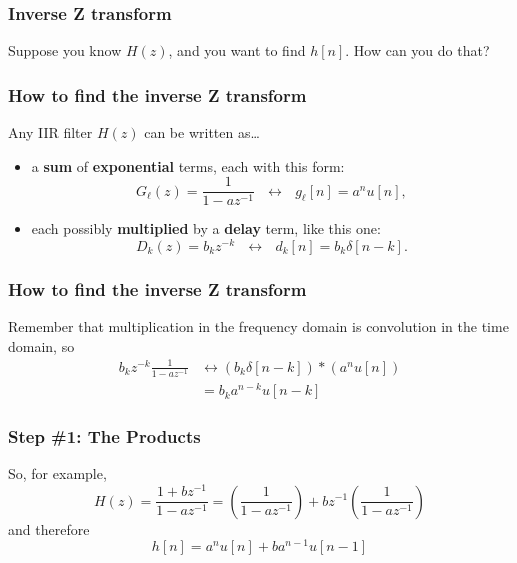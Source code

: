 \documentclass{beamer}
\begin{document}
\begin{frame}
  \frametitle{Inverse Z transform}

  Suppose you know $H(z)$, and you want to find $h[n]$.  How can you
  do that?
\end{frame}
      
\begin{frame}
  \frametitle{How to find the inverse Z transform}

  Any IIR filter $H(z)$ can be written as\ldots
  \begin{itemize}
  \item a {\bf sum} of {\bf exponential} terms, each with this form:
    \begin{displaymath}
      G_\ell(z)=\frac{1}{1-az^{-1}}~~~\leftrightarrow~~~g_\ell[n]= a^nu[n],
    \end{displaymath}
  \item each possibly {\bf multiplied} by a {\bf delay} term, like this one:
    \begin{displaymath}
      D_k(z)=b_kz^{-k}~~~\leftrightarrow~~~d_k[n]=b_k\delta[n-k].
    \end{displaymath}
  \end{itemize}
\end{frame}

\begin{frame}
  \frametitle{How to find the inverse Z transform}

  Remember that multiplication in the frequency domain is convolution
  in the time domain, so
  \begin{align*}
    b_kz^{-k}\frac{1}{1-az^{-1}}
    &\leftrightarrow\left(b_k\delta[n-k]\right)\ast\left( a^nu[n]\right)\\
    &= b_ka^{n-k}u[n-k]
  \end{align*}
\end{frame}

\begin{frame}
  \frametitle{Step \#1: The Products}

  So, for example,
  \begin{displaymath}
    H(z)=\frac{1+bz^{-1}}{1-az^{-1}}
    =\left(\frac{1}{1-az^{-1}}\right)+bz^{-1}\left(\frac{1}{1-az^{-1}}\right)
  \end{displaymath}
  and therefore
  \begin{displaymath}
    h[n] = a^nu[n] + ba^{n-1}u[n-1]
  \end{displaymath}
\end{frame}
\end{document}
